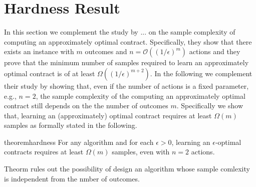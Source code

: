 \section{Hardness Result}
In this section we complement the study by ...  on the sample complexity of computing an approximately optimal contract. Specifically, they show that there exists an instance with $m$ outcomes and $ n = \mathcal{O} (( 1 / \epsilon) ^m) $ actions and they prove that the minimum number of samples required to learn an approximately optimal contract is of at least $\Omega ( ( 1/ \epsilon ) ^{m+2} )$. In the following we complement their study by showing that, even if the number of actions is a fixed parameter, e.g., $n=2$, the sample complexity of the computing an approximately optimal contract still depends on the the number of outcomes $m$. Specifically we show that, learning an (approximately) optimal contract requires at least $\Omega(m)$ samples as formally stated in the following.
\begin{restatable}{theorem}{hardness}
For any algorithm and for each $\epsilon > 0$, learning an $\epsilon$-optimal contracts requires at least $\Omega (m)$ samples, even with $n=2$ actions.
\end{restatable}
Theorm rules out the possibility of design an algorithm whose sample comlexity is independent from the nmber of outcomes. 